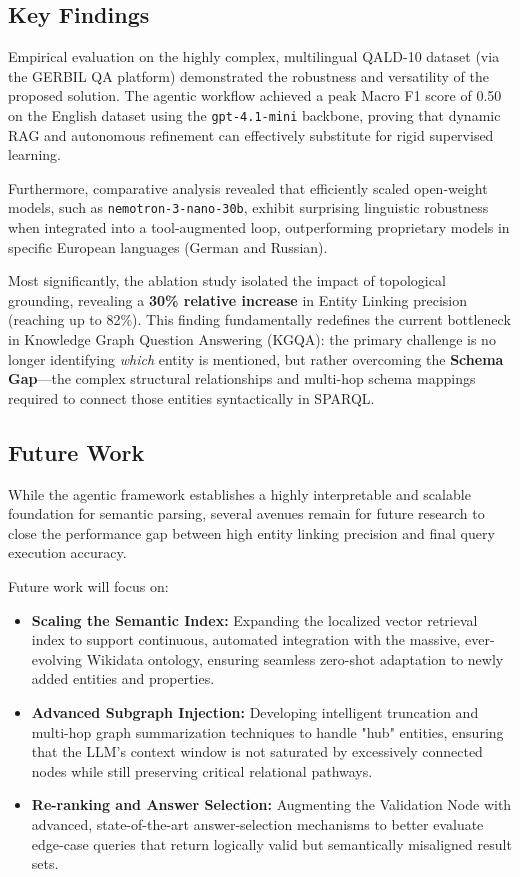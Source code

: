 \subsection{Key Findings}
Empirical evaluation on the highly complex, multilingual QALD-10 dataset (via the GERBIL QA platform) demonstrated the robustness and versatility of the proposed solution. The agentic workflow achieved a peak Macro F1 score of 0.50 on the English dataset using the \texttt{gpt-4.1-mini} backbone, proving that dynamic RAG and autonomous refinement can effectively substitute for rigid supervised learning.

Furthermore, comparative analysis revealed that efficiently scaled open-weight models, such as \texttt{nemotron-3-nano-30b}, exhibit surprising linguistic robustness when integrated into a tool-augmented loop, outperforming proprietary models in specific European languages (German and Russian). 

Most significantly, the ablation study isolated the impact of topological grounding, revealing a \textbf{30\% relative increase} in Entity Linking precision (reaching up to 82\%). This finding fundamentally redefines the current bottleneck in Knowledge Graph Question Answering (KGQA): the primary challenge is no longer identifying \textit{which} entity is mentioned, but rather overcoming the \textbf{Schema Gap}—the complex structural relationships and multi-hop schema mappings required to connect those entities syntactically in SPARQL.

\subsection{Future Work}
While the agentic framework establishes a highly interpretable and scalable foundation for semantic parsing, several avenues remain for future research to close the performance gap between high entity linking precision and final query execution accuracy.

Future work will focus on:
\begin{itemize}
    \item \textbf{Scaling the Semantic Index:} Expanding the localized vector retrieval index to support continuous, automated integration with the massive, ever-evolving Wikidata ontology, ensuring seamless zero-shot adaptation to newly added entities and properties.
    \item \textbf{Advanced Subgraph Injection:} Developing intelligent truncation and multi-hop graph summarization techniques to handle "hub" entities, ensuring that the LLM's context window is not saturated by excessively connected nodes while still preserving critical relational pathways.
    \item \textbf{Re-ranking and Answer Selection:} Augmenting the Validation Node with advanced, state-of-the-art answer-selection mechanisms to better evaluate edge-case queries that return logically valid but semantically misaligned result sets.
\end{itemize}

